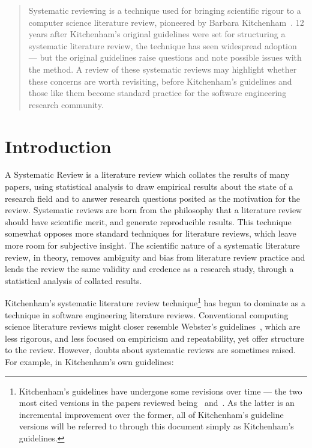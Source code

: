 

\maketitle

\begin{abstract}
Systematic reviewing is a technique used for bringing scientific rigour to a computer science literature review, pioneered by Barbara Kitchenham~\citep{Kitchenham2004}. 12 years after Kitchenham's original guidelines were set for structuring a systematic literature review, the technique has seen widespread adoption --- but the original guidelines raise questions and note possible issues with the method. A review of these systematic reviews may highlight whether these concerns are worth revisiting, before Kitchenham's guidelines and those like them become standard practice for the software engineering research community.
\end{abstract}

\section{Introduction}
A Systematic Review is a literature review which collates the results of many papers, using statistical analysis to draw empirical results about the state of a research field and to answer research questions posited as the motivation for the review. Systematic reviews are born from the philosophy that a literature review should have scientific merit, and generate reproducible results. This technique somewhat opposes more standard techniques for literature reviews, which leave more room for subjective insight. The scientific nature of a systematic literature review, in theory, removes ambiguity and bias from literature review practice and lends the review the same validity and credence as a research study, through a statistical analysis of collated results.\par

Kitchenham's systematic literature review technique\footnote{Kitchenham's guidelines have undergone some revisions over time --- the two most cited versions in the papers reviewed being~\cite{Kitchenham2004} and~\cite{Kitchenham2007}. As the latter is an incremental improvement over the former, all of Kitchenham's guideline versions will be referred to through this document simply as Kitchenham's guidelines.} has begun to dominate as a technique in software engineering literature reviews. Conventional computing science literature reviews might closer resemble Webster's guidelines~\citep{Webster2002}, which are less rigorous, and less focused on empiricism and repeatability, yet offer structure to the review. However, doubts about systematic reviews are sometimes raised. For example, in Kitchenham's own guidelines:


